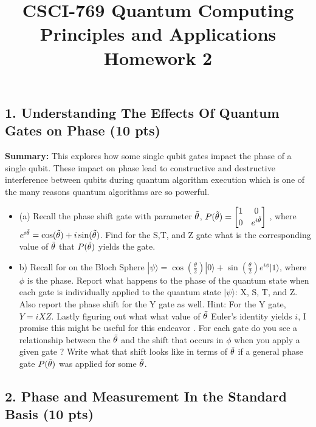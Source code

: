 \documentclass[12pt]{article}
\newcommand{\ket}[1]{| #1 \rangle}
\begin{document}
\title{CSCI-769 Quantum Computing Principles and Applications Homework 2}
\author{}
\date{}
\maketitle

\subsection*{1. Understanding The Effects Of Quantum Gates on Phase (10 pts)}

\textbf{Summary:} This explores how some single qubit gates impact the phase of a single qubit. These impact on phase lead to constructive and destructive interference between qubits during quantum algorithm execution which is one of the many reasons quantum algorithms are so powerful.
\begin{itemize}
    \item (a) Recall the phase shift gate  with parameter $\Tilde{\theta }$, $ P(\Tilde{\theta}) = \begin{bmatrix} 
1 & 0 \\ 
0 & e^{i\Tilde{\theta}} 
\end{bmatrix}$ , where $e^{i \Tilde{\theta}} = \cos(\Tilde{\theta}) +i\sin(\Tilde{\theta}) $. Find for the S,T, and Z gate what is the corresponding value of $\Tilde{\theta} $ that $P(\Tilde{\theta})$ yields the gate. 
\item b) Recall for on the Bloch Sphere $\ket{\psi} = \cos(\frac{\theta}{2}) \ket{0} +\sin(\frac{\theta}{2}) e^{i\phi} \ket{1} $, where $\phi$ is the phase. Report what happens to the phase of the quantum state when each gate is individually applied to the quantum state $\ket{\psi}$: X, S, T, and Z. Also report the phase shift for the Y gate as well. Hint: For the Y gate, $Y=iXZ$. Lastly figuring out what what value of $\Tilde{\theta}$ Euler's identity yields $i$, I promise this might be useful for this endeavor \smiley{}. For each gate do you see a relationship between the $\Tilde{\theta}$ and the shift that occurs in $\phi$ when you apply a given gate \smiley{}? Write what that shift looks like in terms of $\Tilde{\theta}$ if a general phase gate $P(\Tilde{\theta})$ was applied for some $\Tilde{\theta}$.
\end{itemize}






\subsection*{2. Phase and Measurement In the Standard Basis (10 pts)}
\end{document}
